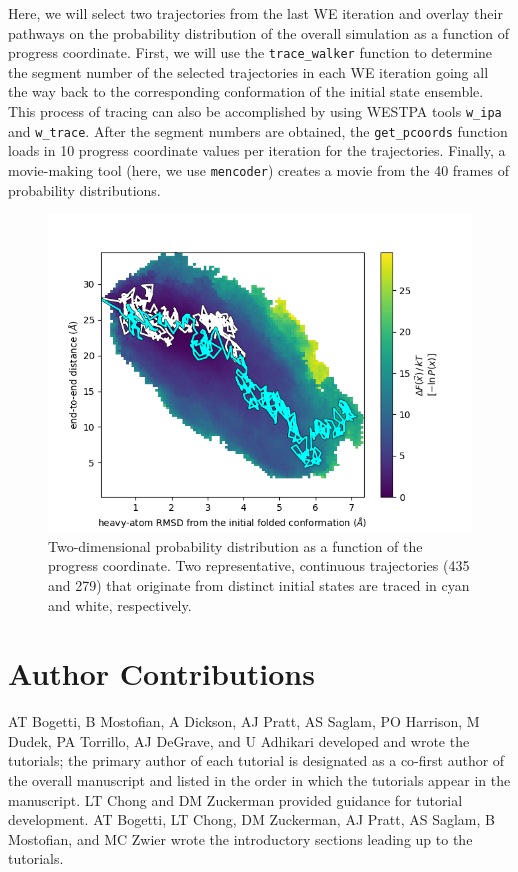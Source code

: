 \documentclass[9pt,tutorial,ASAPversion]{livecoms}
\begin{document}
Here, we will select two trajectories from the last WE iteration and overlay their pathways on the probability distribution of the overall simulation as a function of progress coordinate. 
First, we will use the \verb|trace_walker| function to determine the segment number of the selected trajectories in each WE iteration going all the way back to the corresponding conformation of the initial state ensemble. 
This process of tracing can also be accomplished by using WESTPA tools \verb|w_ipa| and \verb|w_trace|. 
After the segment numbers are obtained, the \verb|get_pcoords| function loads in 10 progress coordinate values per iteration for the trajectories. 
Finally, a movie-making tool (here, we use \verb|mencoder|) creates a movie from the 40 frames of probability distributions. 

\begin{figure}
\includegraphics[width=\linewidth]{Figure13.png}
\caption{Two-dimensional probability distribution as a function of the progress coordinate. 
Two representative, continuous trajectories (435 and 279) that originate from distinct initial states are traced in cyan and white, respectively.}
\label{fig:view}
\end{figure}

\section{Author Contributions}

AT Bogetti, B Mostofian, A Dickson, AJ Pratt, AS Saglam, PO Harrison, M Dudek, PA Torrillo, AJ DeGrave, and U Adhikari developed and wrote the tutorials; the primary author of each tutorial is designated as a co-first author of the overall manuscript and listed in the order in which the tutorials appear in the manuscript. LT Chong and DM Zuckerman provided guidance for tutorial development. 
AT Bogetti, LT Chong, DM Zuckerman, AJ Pratt, AS Saglam, B Mostofian, and MC Zwier wrote the introductory sections leading up to the tutorials. 
\end{document}

